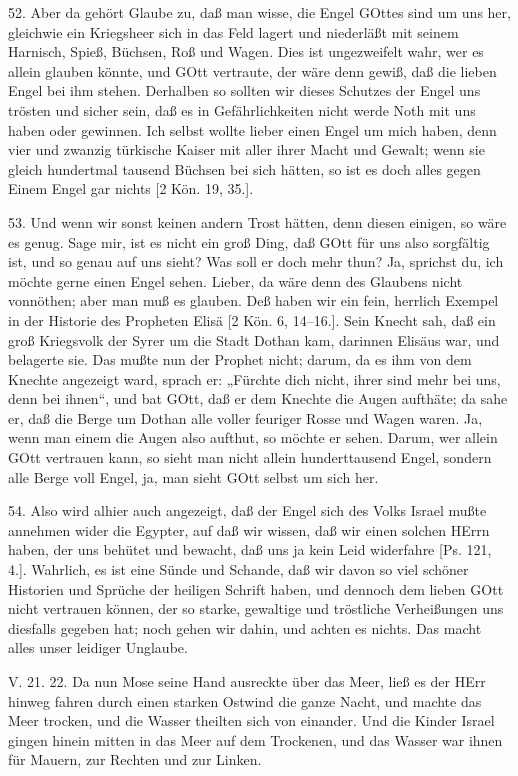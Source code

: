 52. Aber da gehört Glaube zu, daß man wisse, die Engel GOttes sind um uns her, gleichwie ein Kriegsheer sich in das Feld lagert und niederläßt mit seinem Harnisch, Spieß, Büchsen, Roß und Wagen. Dies ist ungezweifelt wahr, wer es allein glauben könnte, und GOtt vertraute, der wäre denn gewiß, daß die lieben Engel bei ihm stehen. Derhalben so sollten wir dieses Schutzes der Engel uns trösten und sicher sein, daß es in Gefährlichkeiten nicht werde Noth mit uns haben oder gewinnen. Ich selbst wollte lieber einen Engel um mich haben, denn vier und zwanzig türkische Kaiser mit aller ihrer Macht und Gewalt; wenn sie gleich hundertmal tausend Büchsen bei sich hätten, so ist es doch alles gegen Einem Engel gar nichts [2 Kön. 19, 35.].

53. Und wenn wir sonst keinen andern Trost hätten, denn diesen einigen, so wäre es genug. Sage mir, ist es nicht ein groß Ding, daß GOtt für uns also sorgfältig ist, und so genau auf uns sieht? Was soll er doch mehr thun? Ja, sprichst du, ich möchte gerne einen Engel sehen. Lieber, da wäre denn des Glaubens nicht vonnöthen; aber man muß es glauben. Deß haben wir ein fein, herrlich Exempel in der Historie des Propheten Elisä [2 Kön. 6, 14–16.]. Sein Knecht sah, daß ein groß Kriegsvolk der Syrer um die Stadt Dothan kam, darinnen Elisäus war, und belagerte sie. Das mußte nun der Prophet nicht; darum, da es ihm von dem Knechte angezeigt ward, sprach er: „Fürchte dich nicht, ihrer sind mehr bei uns, denn bei ihnen“, und bat GOtt, daß er dem Knechte die Augen aufthäte; da sahe er, daß die Berge um Dothan alle voller feuriger Rosse und Wagen waren. Ja, wenn man einem die Augen also aufthut, so möchte er sehen. Darum, wer allein GOtt vertrauen kann, so sieht man nicht allein hunderttausend Engel, sondern alle Berge voll Engel, ja, man sieht GOtt selbst um sich her.

54. Also wird alhier auch angezeigt, daß der Engel sich des Volks Israel mußte annehmen wider die Egypter, auf daß wir wissen, daß wir einen solchen HErrn haben, der uns behütet und bewacht, daß uns ja kein Leid widerfahre [Ps. 121, 4.]. Wahrlich, es ist eine Sünde und Schande, daß wir davon so viel schöner Historien und Sprüche der heiligen Schrift haben, und dennoch dem lieben GOtt nicht vertrauen können, der so starke, gewaltige und tröstliche Verheißungen uns diesfalls gegeben hat; noch gehen wir dahin, und achten es nichts. Das macht alles unser leidiger Unglaube.

\begin{schriftzitat}
V. 21. 22. Da nun Mose seine Hand ausreckte über das Meer, ließ es der HErr hinweg fahren durch einen starken Ostwind die ganze Nacht, und machte das Meer trocken, und die Wasser theilten sich von einander. Und die Kinder Israel gingen hinein mitten in das Meer auf dem Trockenen, und das Wasser war ihnen für Mauern, zur Rechten und zur Linken.
\end{schriftzitat}


